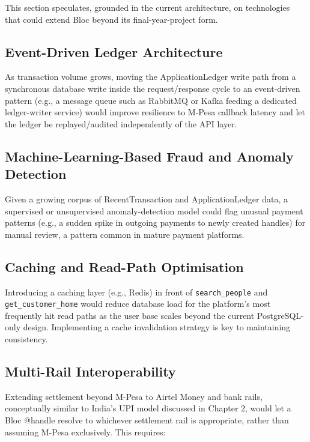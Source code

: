 \documentclass[12pt, a4paper, twoside, openright]{report}
\begin{document}
This section speculates, grounded in the current architecture, on technologies that could extend Bloc beyond its final-year-project form.

\subsection{Event-Driven Ledger Architecture}

As transaction volume grows, moving the ApplicationLedger write path from a synchronous database write inside the request/response cycle to an event-driven pattern (e.g., a message queue such as RabbitMQ or Kafka feeding a dedicated ledger-writer service) would improve resilience to M-Pesa callback latency and let the ledger be replayed/audited independently of the API layer.

\subsection{Machine-Learning-Based Fraud and Anomaly Detection}

Given a growing corpus of RecentTransaction and ApplicationLedger data, a supervised or unsupervised anomaly-detection model could flag unusual payment patterns (e.g., a sudden spike in outgoing payments to newly created handles) for manual review, a pattern common in mature payment platforms.

\subsection{Caching and Read-Path Optimisation}

Introducing a caching layer (e.g., Redis) in front of \texttt{search\_people} and \texttt{get\_customer\_home} would reduce database load for the platform's most frequently hit read paths as the user base scales beyond the current PostgreSQL-only design. Implementing a cache invalidation strategy is key to maintaining consistency.

\subsection{Multi-Rail Interoperability}

Extending settlement beyond M-Pesa to Airtel Money and bank rails, conceptually similar to India's UPI model discussed in Chapter 2, would let a Bloc @handle resolve to whichever settlement rail is appropriate, rather than assuming M-Pesa exclusively. This requires:
\end{document}
